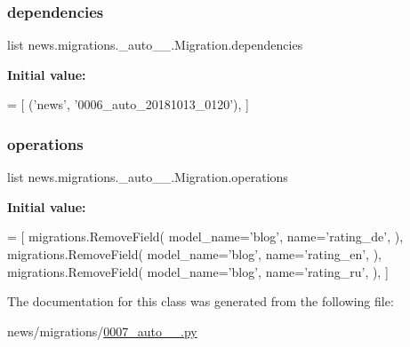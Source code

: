 \subsubsection{\texorpdfstring{dependencies}{dependencies}}
{\footnotesize\ttfamily list news.\+migrations.\+\_\+auto\+\_\+\_.\+Migration.\+dependencies\hspace{0.3cm}{\ttfamily [static]}}

{\bfseries Initial value\+:}
\begin{DoxyCode}
=  [
        (\textcolor{stringliteral}{'news'}, \textcolor{stringliteral}{'0006\_auto\_20181013\_0120'}),
    ]
\end{DoxyCode}
\mbox{\label{classnews_1_1migrations_1_10007__auto__20181013__0120_1_1_migration_af1237b52d8a38918f6d7d1ad584aca31}} 
\subsubsection{\texorpdfstring{operations}{operations}}
{\footnotesize\ttfamily list news.\+migrations.\+\_\+auto\+\_\+\_.\+Migration.\+operations\hspace{0.3cm}{\ttfamily [static]}}

{\bfseries Initial value\+:}
\begin{DoxyCode}
=  [
        migrations.RemoveField(
            model\_name=\textcolor{stringliteral}{'blog'},
            name=\textcolor{stringliteral}{'rating\_de'},
        ),
        migrations.RemoveField(
            model\_name=\textcolor{stringliteral}{'blog'},
            name=\textcolor{stringliteral}{'rating\_en'},
        ),
        migrations.RemoveField(
            model\_name=\textcolor{stringliteral}{'blog'},
            name=\textcolor{stringliteral}{'rating\_ru'},
        ),
    ]
\end{DoxyCode}


The documentation for this class was generated from the following file\+:\begin{DoxyCompactItemize}
\item 
news/migrations/\mbox{\hyperlink{0007__auto__20181013__0120_8py}{0007\+\_\+auto\+\_\+\_.\+py}}\end{DoxyCompactItemize}
